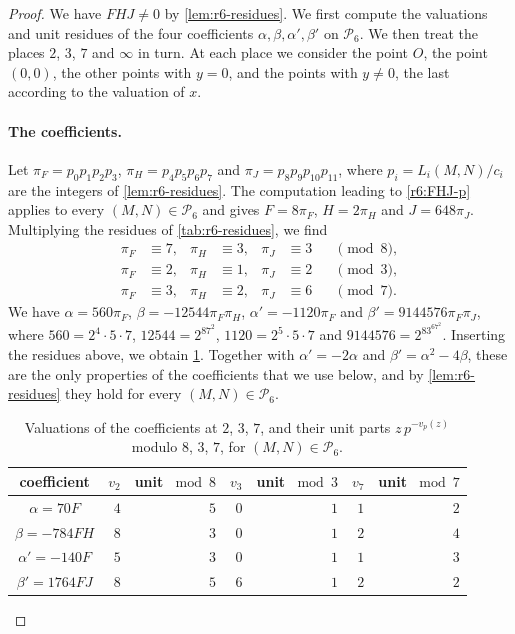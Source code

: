 \documentclass[12pt,oneside,openany]{book}
\theoremstyle{definition}
\theoremstyle{plain}
\numberwithin{equation}{chapter}
\theoremstyle{plain}
\theoremstyle{definition}
\theoremstyle{remark}
\newcommand{\cP}{\mathcal P}
\begin{document}
\begin{proof}
We have $FHJ\ne0$ by \cref{lem:r6-residues}. We first compute the valuations and unit residues of the four coefficients $\alpha,\beta,\alpha',\beta'$ on $\cP_6$. We then treat the places $2$, $3$, $7$ and $\infty$ in turn. At each place we consider the point $O$, the point $(0,0)$, the other points with $y=0$, and the points with $y\ne0$, the last according to the valuation of $x$.

\paragraph{The coefficients.} Let $\pi_F=p_0p_1p_2p_3$, $\pi_H=p_4p_5p_6p_7$ and $\pi_J=p_8p_9p_{10}p_{11}$, where $p_i=L_i(M,N)/c_i$ are the integers of \cref{lem:r6-residues}. The computation leading to \eqref{r6:FHJ-p} applies to every $(M,N)\in\cP_6$ and gives $F=8\pi_F$, $H=2\pi_H$ and $J=648\pi_J$. Multiplying the residues of \cref{tab:r6-residues}, we find
\[
\begin{aligned}
\pi_F&\equiv7,& \pi_H&\equiv3,& \pi_J&\equiv3 &&\pmod 8,\\
\pi_F&\equiv2,& \pi_H&\equiv1,& \pi_J&\equiv2 &&\pmod 3,\\
\pi_F&\equiv3,& \pi_H&\equiv2,& \pi_J&\equiv6 &&\pmod 7.
\end{aligned}
\]
We have $\alpha=560\pi_F$, $\beta=-12544\pi_F\pi_H$, $\alpha'=-1120\pi_F$ and $\beta'=9144576\pi_F\pi_J$, where $560=2^4\cdot5\cdot7$, $12544=2^87^2$, $1120=2^5\cdot5\cdot7$ and $9144576=2^83^67^2$. Inserting the residues above, we obtain \cref{tab:r6-coeffs}. Together with $\alpha'=-2\alpha$ and $\beta'=\alpha^2-4\beta$, these are the only properties of the coefficients that we use below, and by \cref{lem:r6-residues} they hold for every $(M,N)\in\cP_6$.

\begin{table}[htbp]
\centering
\caption{Valuations of the coefficients at $2$, $3$, $7$, and their unit parts $z\,p^{-v_p(z)}$ modulo $8$, $3$, $7$, for $(M,N)\in\cP_6$.}
\label{tab:r6-coeffs}
\begin{tabular}{crrrrrr}
\toprule
coefficient & $v_2$ & unit $\bmod 8$ & $v_3$ & unit $\bmod 3$ & $v_7$ & unit $\bmod 7$\\
\midrule
$\alpha=70F$ & $4$ & $5$ & $0$ & $1$ & $1$ & $2$\\
$\beta=-784FH$ & $8$ & $3$ & $0$ & $1$ & $2$ & $4$\\
$\alpha'=-140F$ & $5$ & $3$ & $0$ & $1$ & $1$ & $3$\\
$\beta'=1764FJ$ & $8$ & $5$ & $6$ & $1$ & $2$ & $2$\\
\bottomrule
\end{tabular}
\end{table}


\end{proof}
\end{document}
